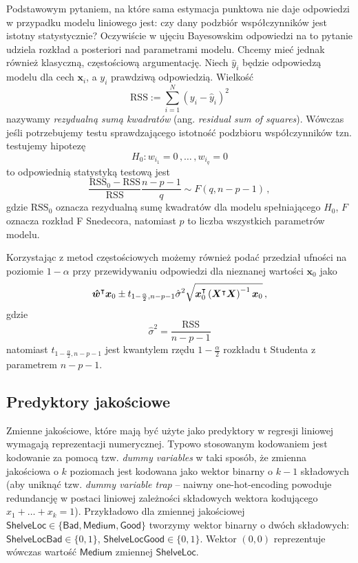 \documentclass{myclass}
\begin{document}
Podstawowym pytaniem, na które sama estymacja punktowa nie daje odpowiedzi w przypadku modelu
liniowego jest: czy dany podzbiór współczynników jest istotny statystycznie? Oczywiście w ujęciu
Bayesowskim odpowiedzi na to pytanie udziela rozkład a posteriori nad parametrami modelu. Chcemy
mieć jednak również klasyczną, częstościową argumentację. Niech \(\hat{y}_i\) będzie odpowiedzą
modelu dla cech \(\bm{x}_i\), a \(y_i\) prawdziwą odpowiedzią. Wielkość
\[
    \text{RSS} := \sum_{i=1}^N (y_i - \hat{y}_i)^2
\]
nazywamy \emph{rezydualną sumą kwadratów} (ang. \emph{residual sum of squares}). Wówczas jeśli
potrzebujemy testu sprawdzającego istotność podzbioru współczynników tzn. testujemy hipotezę
\[
    H_0 : w_{i_1} = 0\,,\ldots\,,w_{i_q} = 0
\]
to odpowiednią statystyką testową jest 
\[
    \frac{ \text{RSS}_0 -  \text{RSS}}{ \text{RSS}}\frac{n - p - 1}{q} \sim F(q, n-p-1)\,,
\]
gdzie \( \text{RSS}_0\) oznacza rezydualną sumę kwadratów dla modelu spełniającego \(H_0\), \(F\) oznacza
rozkład F Snedecora, natomiast \(p\) to liczba wszystkich parametrów modelu.

Korzystając z metod częstościowych możemy również podać przedział ufności na poziomie \(1 - \alpha\)
przy przewidywaniu odpowiedzi dla nieznanej wartości \(\bm{x}_0\) jako
\[
    \bm{\hat{w}}^\intercal \bm{x}_0 \pm t_{1-\frac{\alpha}{2},n-p-1} \hat{\sigma}^2 \sqrt{\bm{x}_0^\intercal \left(\bm{X}^\intercal \bm{X}\right)^{-1}\bm{x}_0}\,,
\]
gdzie
\[
    \hat{\sigma}^2 = \frac{ \text{RSS}}{n - p - 1}
\]
natomiast \(t_{1-\frac{\alpha}{2},n-p-1}\) jest kwantylem rzędu \(1-\frac{\alpha}{2}\) rozkładu t
Studenta z parametrem \(n - p - 1\).

\subsection{Predyktory jakościowe}

Zmienne jakościowe, które mają być użyte jako predyktory w regresji liniowej wymagają reprezentacji
numerycznej. Typowo stosowanym kodowaniem jest kodowanie za pomocą tzw. \emph{dummy variables} w
taki sposób, że zmienna jakościowa o $k$ poziomach jest kodowana jako wektor binarny o $k-1$
składowych (aby uniknąć tzw. \emph{dummy variable trap} -- naiwny one-hot-encoding powoduje
redundancję w postaci liniowej zależności składowych wektora kodującego $x_1 + \ldots + x_k = 1$).
Przykładowo dla zmiennej jakościowej $\mathsf{ShelveLoc} \in \{\mathsf{Bad}, \mathsf{Medium},
\mathsf{Good}\}$ tworzymy wektor binarny o dwóch składowych: $\mathsf{ShelveLocBad} \in \{0,1\}$,
$\mathsf{ShelveLocGood} \in \{0,1\}$. Wektor $(0,0)$ reprezentuje wówczas wartość $\mathsf{Medium}$
zmiennej $\mathsf{ShelveLoc}$.
\end{document}
